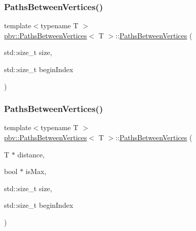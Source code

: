 \subsubsection{\texorpdfstring{Paths\+Between\+Vertices()}{PathsBetweenVertices()}\hspace{0.1cm}{\footnotesize\ttfamily [2/4]}}
{\footnotesize\ttfamily template$<$typename T $>$ \\
\mbox{\hyperlink{structpbv_1_1_paths_between_vertices}{pbv\+::\+Paths\+Between\+Vertices}}$<$ T $>$\+::\mbox{\hyperlink{structpbv_1_1_paths_between_vertices}{Paths\+Between\+Vertices}} (\begin{DoxyParamCaption}\item[{std\+::size\+\_\+t}]{size,  }\item[{std\+::size\+\_\+t}]{begin\+Index }\end{DoxyParamCaption})}

\mbox{\label{structpbv_1_1_paths_between_vertices_a774e36d73a973b9e301e4dbce74b7b29}} 
\subsubsection{\texorpdfstring{Paths\+Between\+Vertices()}{PathsBetweenVertices()}\hspace{0.1cm}{\footnotesize\ttfamily [3/4]}}
{\footnotesize\ttfamily template$<$typename T $>$ \\
\mbox{\hyperlink{structpbv_1_1_paths_between_vertices}{pbv\+::\+Paths\+Between\+Vertices}}$<$ T $>$\+::\mbox{\hyperlink{structpbv_1_1_paths_between_vertices}{Paths\+Between\+Vertices}} (\begin{DoxyParamCaption}\item[{T $\ast$}]{distance,  }\item[{bool $\ast$}]{is\+Max,  }\item[{std\+::size\+\_\+t}]{size,  }\item[{std\+::size\+\_\+t}]{begin\+Index }\end{DoxyParamCaption})}

\mbox{\label{structpbv_1_1_paths_between_vertices_a7b7fadc0fedb587ae9b7deb62ebb6a1c}} 
